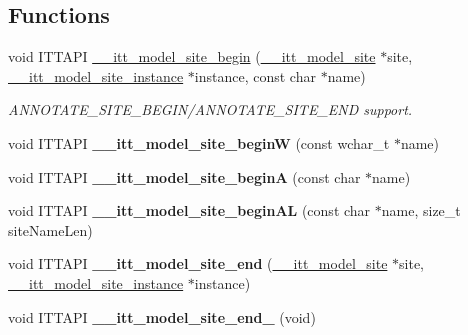 \subsection*{Functions}
\begin{DoxyCompactItemize}
\item 
void I\+T\+T\+A\+P\+I \hyperlink{group__model_gaa3168df03ab6c8a28c0534fb26dc48c5}{\+\_\+\+\_\+itt\+\_\+model\+\_\+site\+\_\+begin} (\hyperlink{group__model_ga920087b18ed59a70239461b5295cc26e}{\+\_\+\+\_\+itt\+\_\+model\+\_\+site} $\ast$site, \hyperlink{group__model_gaa037f000a165fb7fc2c73b97b31491f1}{\+\_\+\+\_\+itt\+\_\+model\+\_\+site\+\_\+instance} $\ast$instance, const char $\ast$name)
\begin{DoxyCompactList}\small\item\em A\+N\+N\+O\+T\+A\+T\+E\+\_\+\+S\+I\+T\+E\+\_\+\+B\+E\+G\+I\+N/\+A\+N\+N\+O\+T\+A\+T\+E\+\_\+\+S\+I\+T\+E\+\_\+\+E\+N\+D support. \end{DoxyCompactList}\item 
\hypertarget{group__model_ga1a2a8393f594d8998c2d5022154ae605}{}void I\+T\+T\+A\+P\+I {\bfseries \+\_\+\+\_\+itt\+\_\+model\+\_\+site\+\_\+begin\+W} (const wchar\+\_\+t $\ast$name)\label{group__model_ga1a2a8393f594d8998c2d5022154ae605}

\item 
\hypertarget{group__model_ga5a0b72caf3a67067e456675d357104f4}{}void I\+T\+T\+A\+P\+I {\bfseries \+\_\+\+\_\+itt\+\_\+model\+\_\+site\+\_\+begin\+A} (const char $\ast$name)\label{group__model_ga5a0b72caf3a67067e456675d357104f4}

\item 
\hypertarget{group__model_ga4a35497abdc2fbfeb77bb375f7a6d8dc}{}void I\+T\+T\+A\+P\+I {\bfseries \+\_\+\+\_\+itt\+\_\+model\+\_\+site\+\_\+begin\+A\+L} (const char $\ast$name, size\+\_\+t site\+Name\+Len)\label{group__model_ga4a35497abdc2fbfeb77bb375f7a6d8dc}

\item 
\hypertarget{group__model_ga979718d663efa6f9250fdb892a7e8e08}{}void I\+T\+T\+A\+P\+I {\bfseries \+\_\+\+\_\+itt\+\_\+model\+\_\+site\+\_\+end} (\hyperlink{group__model_ga920087b18ed59a70239461b5295cc26e}{\+\_\+\+\_\+itt\+\_\+model\+\_\+site} $\ast$site, \hyperlink{group__model_gaa037f000a165fb7fc2c73b97b31491f1}{\+\_\+\+\_\+itt\+\_\+model\+\_\+site\+\_\+instance} $\ast$instance)\label{group__model_ga979718d663efa6f9250fdb892a7e8e08}

\item 
\hypertarget{group__model_ga427f7c1c6bfaf06cd6d895e066451bf9}{}void I\+T\+T\+A\+P\+I {\bfseries \+\_\+\+\_\+itt\+\_\+model\+\_\+site\+\_\+end\+\_} (void)\label{group__model_ga427f7c1c6bfaf06cd6d895e066451bf9}


\end{DoxyCompactItemize}
